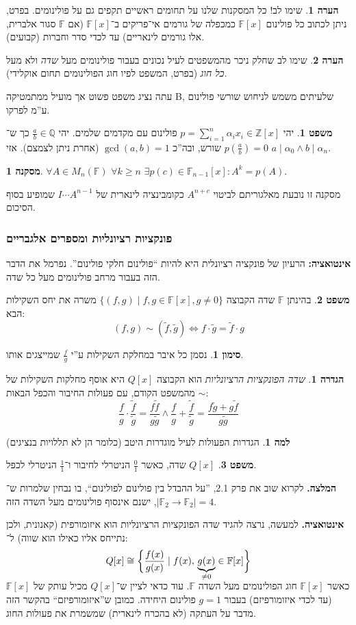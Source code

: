\documentclass[a4paper]{article}
\newcommand\Z     {\mathbb{Z}}
\newcommand\Q     {\mathbb{Q}}
\newcommand\sumnio    {\sum_{i = 1}^{n}}
\newcommand\F         {\mathbb{F}}
\newcommand\co        {\colon}
\newcommand\ag        {\alpha}
\newcommand\tl    {\tilde}
\newcommand\sof[1]    {\left | #1 \right |}
\newcommand\cl [1]    {\left ( #1 \right )}
\newcommand\ccb[1]    {\left \{ #1 \right \}}
\theoremstyle{definition}
\newtheorem{Theorem}{\color{myblue}משפט}
\newtheorem{Definition}{\color{mygreen}הגדרה}
\newtheorem{Lemma}{\color{myyellow}למה}
\newtheorem{Remark}{\color{mycyan}הערה}
\newtheorem{Notion}{\color{myred}סימון}
\newtheorem{Collary}{\color{mymagenta}מסקנה}
\newcommand\cola [1] {\begin{Collary}#1\end{Collary}}
\newcommand\theo  [1] {\begin{Theorem}#1\end{Theorem}}
\newcommand\defi  [1] {\begin{Definition}#1\end{Definition}}
\newcommand\rmark [1] {\begin{Remark}#1\end{Remark}}
\newcommand\lem   [1] {\begin{Lemma}#1\end{Lemma}}
\newcommand\noti  [1] {\begin{Notion}#1\end{Notion}}
\begin{document}
	\rmark{שימו לב! כל המסקנות שלנו על תחומים ראשיים תקפים גם על פולינומים. בפרט, ניתן לכתוב כל פולינום $\F[x]$ כמכפלה של גורמים אי־פריקים ב־$\F[x]$ (אם $\F$ סגור אלברית, אלו גורמים לינאריים) עד לכדי סדר וחברות (קבועים). }
	\rmark{שימו לב שחלק ניכר מהמשפטים לעיל נכונים בעבור פולינומים מעל \textit{שדה} ולא מעל \textit{כל חוג} (בפרט, המשפט לפיו חוג הפולינומים תחום אוקלידי). }
	עתה נציג משפט פשוט אך מועיל ממתמטיקה B, שלעיתים משמש לניחוש שורשי פולינום ע''מ לפרקו. 
	\theo{יהי $p = \sumnio \ag_i x_i \in \Z[x]$ פולינום עם מקדמים שלמים. יהי $\frac{a}{b} \in \Q$ כך ש־$p\cl{\frac{a}{b}} = 0$ שורש, ובה''כ $\gcd(a, b) = 1$ (אחרת ניתן לצמצם). אזי $a \mid \ag_0 \land b \mid \ag_n$. }
	
	\cola{$\forall A \in M_n(\F) \,\, \forall k \ge n \,\, \exists p(c) \in \F_{n - 1}[x] \co A^{k} = p(A)$. }
	מסקנה זו נובעת מאלגוריתם לביטוי $A^{n + c}$ כקומבינציה לינארית של $I \cdots A^{n - 1}$ שמופיע בסוף הסיכום. 
	
	\subsubsection{פונקציות רציונליות ומספרים אלגבריים}
	\textbf{אינטואציה: }הרעיון של פונקציה רציונלית היא להיות ``פולינום חלקי פולינום''. נפרמל את הדבר הזה בעבור מרחב פולינומים מעל כל שדה. 
	
	\theo{בהינתן $\F$ שדה הקבוצה $\{(f, g) \mid f, g \in \F[x], g \neq 0\}$ משרה את יחס השקילות הבא: 
	\[ (f, g) \sim (\tl f, \tl g) \iff f \cdot \tl g = \tl f \cdot g \]}
	\noti{נסמן כל איבר במחלקת השקילות ע''י $\frac{f}{g}$ שמייצגים אותו. }
	\defi{\textit{שדה הפונקציות הרציונליות} הוא הקבוצה $Q[x]$ היא אוסף מחלקות השקילות של $\sim$ מהמשפט הקודם, עם פעולות החיבור והכפל הבאות: 
	\[ \frac{f}{g} \cdot \frac{\tl f}{\tl g} = \frac{f \tl f}{g \tl g} \land \frac{f}{g} + \frac{\tl f}{\tl g} = \frac{f \tl g + g \tl f}{g \tl g} \]}
	\lem{הגדרות הפעולות לעיל מוגדרות היטב (כלומר הן לא תללויות בנציגים)}
	\theo{$Q[x]$ שדה, כאשר $\frac{0}{1}$ הניטרלי לחיבור ו־$\frac{1}{1}$ הניטרלי לכפל. }
	\textbf{המלצה. }לקרוא שוב את פרק 2.1, ''על ההבדל בין פולינום לפולינום``, בו נבחין שלמרות ש־$\sof{\F_2 \to \F_2} = 4$, ישנם אינסוף פולינומים מעל השדה הזה. 
	
	\textbf{אינטואציה. }למעשה, נרצה להגיד שדה הפונקציות הרציונליות הוא איזומורפית (קאנונית, ולכן נתייחס אליו כאילו הוא שווה) ל־: 
	\[ Q[x] \cong \ccb{\frac{f(x)}{g(x)} \mid f(x), \,\smash{\underbrace{g(x)}_{\neq 0}} \in \F[x]} \]
	כאשר $\F[x]$ חוג הפולינומים מעל השדה $\F$. עוד כדאי לציין ש־$Q[x]$ מכיל עותק של $\F[x]$ (עד לכדי איזומורפיזם) בעבור $g = 1$ פולינום היחידה. כמובן ש''איזומורפיזם`` בהקשר הזה מדבר על העתקה (לא בהכרח לינארית) שמשמרת את פעולות החוג. 
	
\end{document}
